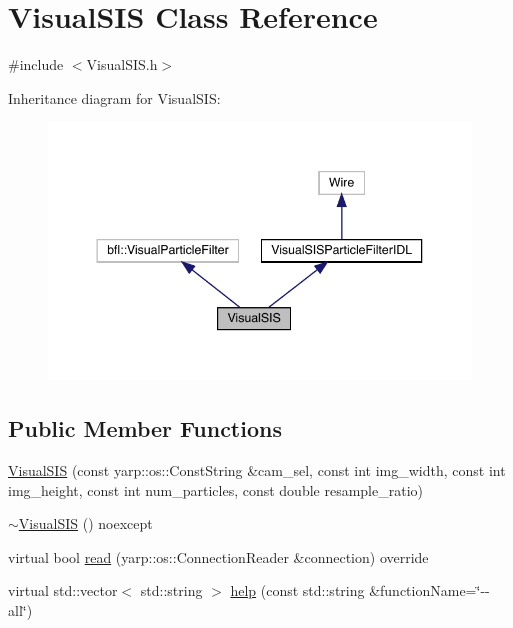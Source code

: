 \hypertarget{classVisualSIS}{}\section{Visual\+S\+IS Class Reference}
\label{classVisualSIS}


{\ttfamily \#include $<$Visual\+S\+I\+S.\+h$>$}



Inheritance diagram for Visual\+S\+IS\+:
\nopagebreak
\begin{figure}[H]
\begin{center}
\leavevmode
\includegraphics[width=344pt]{classVisualSIS__inherit__graph}
\end{center}
\end{figure}
\subsection*{Public Member Functions}
\begin{DoxyCompactItemize}
\item 
\hyperlink{classVisualSIS_a9088e9979575b7138557bbb02e81c59c}{Visual\+S\+IS} (const yarp\+::os\+::\+Const\+String \&cam\+\_\+sel, const int img\+\_\+width, const int img\+\_\+height, const int num\+\_\+particles, const double resample\+\_\+ratio)
\item 
\hyperlink{classVisualSIS_a9b57f7b419bd86a4528cbe87e6f53a14}{$\sim$\+Visual\+S\+IS} () noexcept
\item 
virtual bool \hyperlink{classVisualSISParticleFilterIDL_aade5ce77926faff0e94ffbf77f20c2c0}{read} (yarp\+::os\+::\+Connection\+Reader \&connection) override
\item 
virtual std\+::vector$<$ std\+::string $>$ \hyperlink{classVisualSISParticleFilterIDL_a3253f4dbc55e47183c04eb2e1054733c}{help} (const std\+::string \&function\+Name=\char`\"{}-\/-\/all\char`\"{})
\end{DoxyCompactItemize}
